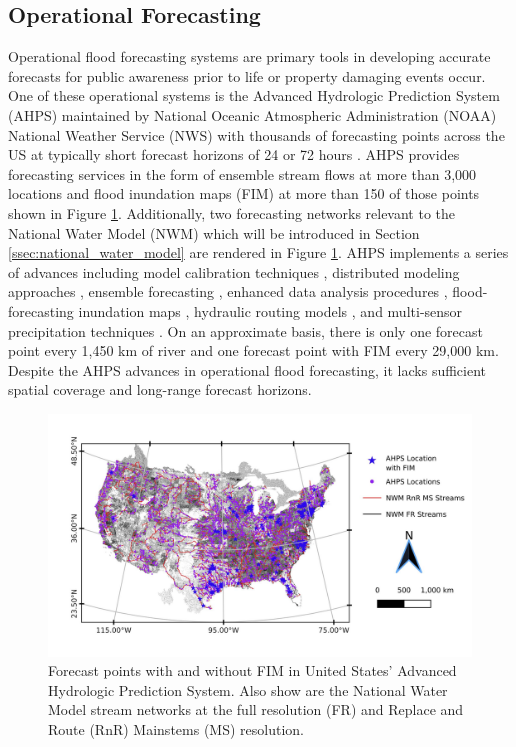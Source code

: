 \subsection{Operational Forecasting}
%
Operational flood forecasting systems are primary tools in developing accurate forecasts for public awareness prior to life or property damaging events occur. 
One of these operational systems is the Advanced Hydrologic Prediction System (AHPS) maintained by National Oceanic Atmospheric Administration (NOAA) National Weather Service (NWS) with thousands of forecasting points across the US at typically short forecast horizons of 24 or 72 hours \cite{mcenery2005noaa}.
AHPS provides forecasting services in the form of ensemble stream flows at more than 3,000 locations and flood inundation maps (FIM) at more than 150 of those points shown in Figure \ref{fig:forecast_points}.
Additionally, two forecasting networks relevant to the National Water Model (NWM) which will be introduced in Section \ref{ssec:national_water_model} are rendered in Figure \ref{fig:forecast_points}.
AHPS implements a series of advances including model calibration techniques \cite{zhang2003hydrologic,hogue2003multi,duan2003global,gupta2003advances,parada2003multi}, distributed modeling approaches \cite{reed2004overall,koren2004hydrology,duan2002results}, ensemble forecasting \cite{day1985extended,seo2000simulation,mullusky2002simplified,herr2002simplified}, enhanced data analysis procedures \cite{mcenery2005noaa}, flood-forecasting inundation maps \cite{cajina2002fldview}, hydraulic routing models \cite{fread1973technique,cajina2002fldview}, and multi-sensor precipitation techniques \cite{breidenbach1999accounting,kondragunta2001outlier,seo2002real,bonnin1996noaa}.
On an approximate basis, there is only one forecast point every 1,450 km of river and one forecast point with FIM every 29,000 km.
Despite the AHPS advances in operational flood forecasting, it lacks sufficient spatial coverage and long-range forecast horizons.
%
\begin{figure}[h!]
\centering
\includegraphics[scale=1.0]{figures/forecast_points.jpg}
\caption{Forecast points with and without FIM in United States' Advanced Hydrologic Prediction System. Also show are the National Water Model stream networks at the full resolution (FR) and Replace and Route (RnR) Mainstems (MS) resolution.}
\label{fig:forecast_points}
\end{figure}
%
